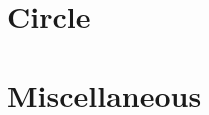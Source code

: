 \documentclass[11pt]{book}
\begin{document}
\chapter{Circle}

\chapter{Miscellaneous }

\iffalse
% 
\backmatter
\appendix
\chapter{Area of a Circle}

\fi
%
%

%
%
%
\latexprintindex
\end{document}
